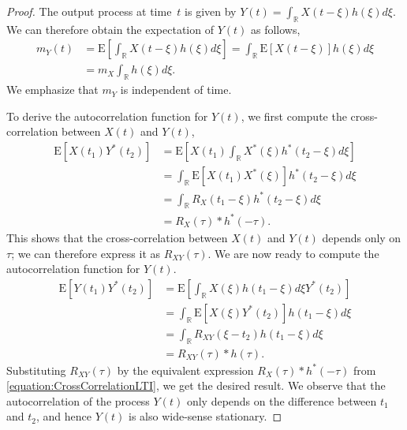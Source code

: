 \begin{proof}
The output process at time~$t$ is given by $Y(t) = \int_{\mathbb{R}} X(t - \xi) h(\xi) d\xi$.
We can therefore obtain the expectation of $Y(t)$ as follows,
\begin{equation*}
\begin{split}
m_Y (t) &= \mathrm{E} \left[ \int_{\mathbb{R}} X(t - \xi) h(\xi) d\xi \right]
= \int_{\mathbb{R}} \mathrm{E} \left[ X(t - \xi) \right] h(\xi) d\xi \\
&= m_X \int_{\mathbb{R}} h(\xi) d\xi.
\end{split}
\end{equation*}
We emphasize that $m_Y$ is independent of time.

To derive the autocorrelation function for $Y(t)$, we first compute the cross-correlation between $X(t)$ and $Y(t)$,
\begin{equation} \label{equation:CrossCorrelationLTI}
\begin{split}
\mathrm{E} [X(t_1) Y^*(t_2) ]
&= \mathrm{E} \left[ X(t_1) \int_{\mathbb{R}} X^*(\xi) h^*(t_2 - \xi) d\xi \right] \\
&= \int_{\mathbb{R}} \mathrm{E} \left[ X(t_1) X^*(\xi) \right] h^*(t_2 - \xi) d\xi \\
&= \int_{\mathbb{R}} R_X(t_1 - \xi) h^*(t_2 - \xi) d\xi \\
&= R_X(\tau) \ast h^*(-\tau) .
\end{split}
\end{equation}
This shows that the cross-correlation between $X(t)$ and $Y(t)$ depends only on $\tau$; we can therefore express it as $R_{XY}(\tau)$.
We are now ready to compute the autocorrelation function for $Y(t)$.
\begin{equation} \label{equation:AutoCorrelationLTI}
\begin{split}
\mathrm{E} [Y(t_1) Y^*(t_2) ]
&= \mathrm{E} \left[ \int_{\mathbb{R}} X(\xi) h(t_1 - \xi) d\xi Y^*(t_2) \right] \\
&= \int_{\mathbb{R}} \mathrm{E} \left[ X(\xi) Y^*(t_2) \right] h(t_1 - \xi) d\xi \\
&= \int_{\mathbb{R}} R_{XY}(\xi - t_2) h(t_1 - \xi) d\xi \\
&= R_{XY}(\tau) \ast h(\tau) .
\end{split}
\end{equation}
Substituting $R_{XY} (\tau)$ by the equivalent expression $R_X(\tau) \ast h^*(-\tau)$ from \eqref{equation:CrossCorrelationLTI}, we get the desired result.
We observe that the autocorrelation of the process $Y(t)$ only depends on the difference between $t_1$ and $t_2$, and hence $Y(t)$ is also wide-sense stationary.
\end{proof}

